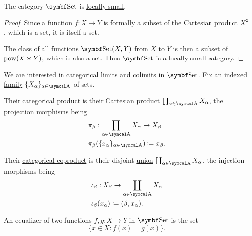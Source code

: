 \begin{proposition}\label{thm:set_is_locally_small}
  The category \( \Cat{Set} \) is \hyperref[def:category_cardinality]{locally small}.
\end{proposition}
\begin{proof}
  Since a function \( f: X \to Y \) is \hyperref[def:function]{formally} a subset of the \hyperref[def:cartesian_product]{Cartesian product} \( X^2 \), which is a set, it is itself a set.

  The class of all functions \( \Cat{Set}(X, Y) \) from \( X \) to \( Y \) is then a subset of \( \operatorname{pow}(X \times Y) \), which is also a set. Thus \( \Cat{Set} \) is a locally small category.
\end{proof}

\begin{proposition}\label{thm:set_categorical_limits}
  We are interested in \hyperref[def:categorical_limit]{categorical limits} and \hyperref[def:categorical_colimit]{colimits} in \( \Cat{Set} \). Fix an indexed \hyperref[def:indexed_family]{family} \( \{ X_\al \}_{\al \in \CA} \) of sets.
  \begin{defenum}
     Their \hyperref[def:categorical_product]{categorical product} is their \hyperref[def:cartesian_product]{Cartesian product} \( \prod_{\al \in \CA} X_\al \), the projection morphisms being
    \begin{align*}
      &\pi_\beta: \prod_{\al \in \CA} X_\al \to X_\beta \\
      &\pi_\beta(\{ x_\al \}_{\al \in \CA}) \coloneqq x_\beta.
    \end{align*}

     Their \hyperref[def:categorical_coproduct]{categorical coproduct} is their disjoint \hyperref[def:disjoint_union]{union} \( \coprod_{\al \in \CA} X_\al \), the injection morphisms being
    \begin{align*}
      &\iota_\beta: X_\beta \to \coprod_{\al \in \CA} X_\al \\
      &\iota_\beta(x_\al) \coloneqq (\beta, x_\al).
    \end{align*}

     An equalizer of two functions \( f, g: X \to Y \) in \( \Cat{Set} \) is the set
    \begin{equation*}
      \{ x \in X \colon f(x) = g(x) \}.
    \end{equation*}


\end{defenum}
\end{proposition}
